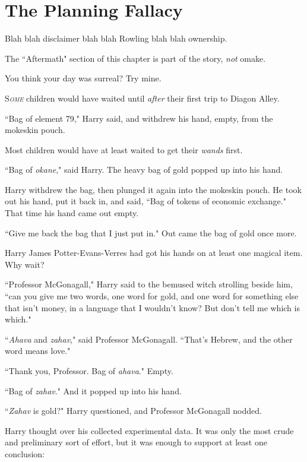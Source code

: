 \chapter{The Planning Fallacy}

\begin{chapterOpeningAuthorNote}
Blah blah disclaimer blah blah Rowling blah blah ownership.

The ``Aftermath" section of this chapter is part of the story, \emph{not} omake.
\end{chapterOpeningAuthorNote}
\begin{chapterOpeningQuote}
You think your day was surreal? Try mine.
\end{chapterOpeningQuote}

\lettrine{S}{\emph{ome}} children would have waited until \emph{after} their first trip to Diagon Alley.

``Bag of element 79," Harry said, and withdrew his hand, empty, from the mokeskin pouch.

Most children would have at least waited to get their \emph{wands} first.

``Bag of \emph{okane}," said Harry. The heavy bag of gold popped up into his hand.

Harry withdrew the bag, then plunged it again into the mokeskin pouch. He took out his hand, put it back in, and said, ``Bag of tokens of economic exchange." That time his hand came out empty.

``Give me back the bag that I just put in." Out came the bag of gold once more.

Harry James Potter-Evans-Verres had got his hands on at least one magical item. Why wait?

``Professor McGonagall," Harry said to the bemused witch strolling beside him, ``can you give me two words, one word for gold, and one word for something else that isn't money, in a language that I wouldn't know? But don't tell me which is which."

``\emph{Ahava} and \emph{zahav}," said Professor McGonagall. ``That's Hebrew, and the other word means love."

``Thank you, Professor. Bag of \emph{ahava}." Empty.

``Bag of \emph{zahav}." And it popped up into his hand.

``\emph{Zahav} is gold?" Harry questioned, and Professor McGonagall nodded.

Harry thought over his collected experimental data. It was only the most crude and preliminary sort of effort, but it was enough to support at least one conclusion:

